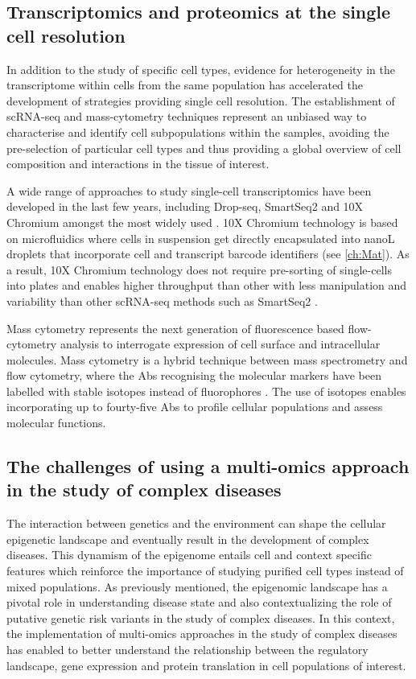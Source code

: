 \subsection{Transcriptomics and proteomics at the single cell resolution}

In addition to the study of specific cell types, evidence for heterogeneity in the transcriptome within cells from the same population has accelerated the development of strategies providing single cell resolution. The establishment of scRNA-seq and mass-cytometry techniques represent an unbiased way to characterise and identify cell subpopulations within the samples, avoiding the pre-selection of particular cell types and thus providing a global overview of cell composition and interactions in the tissue of interest. 

A wide range of approaches to study single-cell transcriptomics have been developed in the last few years, including Drop-seq, SmartSeq2 and 10X Chromium amongst the most widely used \parencite{Picelli2014,Ziegenhain2017}. 10X Chromium technology is based on microfluidics where cells in suspension get directly encapsulated into nanoL droplets that incorporate cell and transcript barcode identifiers (see \ref{ch:Mat}). As a result, 10X Chromium technology does not require pre-sorting of single-cells into plates and enables higher throughput than other with less manipulation and variability than other scRNA-seq methods such as SmartSeq2 \parencite{Baran-Gale2017}.
 
Mass cytometry represents the next generation of fluorescence based flow-cytometry analysis to interrogate expression of cell surface and intracellular molecules. Mass cytometry is a hybrid technique between mass spectrometry and flow cytometry, where the Abs recognising the molecular markers have been labelled with stable isotopes instead of fluorophores \parencite{Bandura2009}. The use of isotopes enables incorporating up to fourty-five Abs to profile cellular populations and assess molecular functions. 



\subsection{The challenges of using a multi-omics approach in the study of complex diseases}

The interaction between genetics and the environment can shape the cellular epigenetic landscape and eventually result in the development of complex diseases. This dynamism of the epigenome entails cell and context specific features which reinforce the importance of studying purified cell types instead of mixed populations. As previously mentioned, the epigenomic landscape has a pivotal role in understanding disease state and also contextualizing the role of putative genetic risk variants in the study of complex diseases. In this context, the implementation of multi-omics approaches in the study of complex diseases has enabled to better understand the relationship between the regulatory landscape, gene expression and protein translation in cell populations of interest. 

